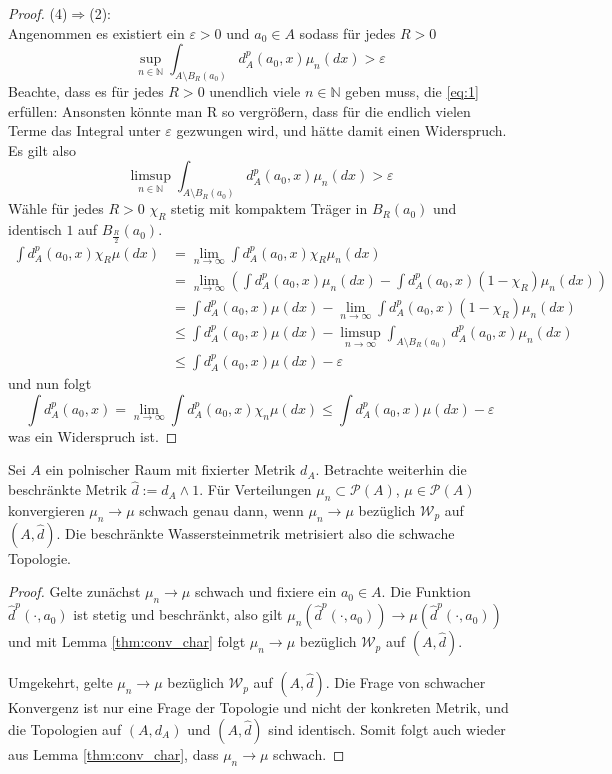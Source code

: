 \begin{proof}
(4)$\Rightarrow$(2): \\
Angenommen es existiert ein $\varepsilon > 0$ und $a_0 \in A$ sodass für jedes $R>0$ 
\begin{equation} \label{eq:1}
\sup\limits_{n\in\mathbb{N}}\int_{A\setminus B_R(a_0)}d_A^p(a_0, x)\mu_n(dx)>\varepsilon
\end{equation}
Beachte, dass es für jedes $R>0$ unendlich viele $n \in \mathbb{N}$ geben muss, die \ref{eq:1} erfüllen: Ansonsten könnte man R so vergrößern, dass für die endlich vielen Terme das Integral unter $\varepsilon$ gezwungen wird, und hätte damit einen Widerspruch. Es gilt also
$$\limsup\limits_{n\in\mathbb{N}}\int_{A\setminus B_R(a_0)}d^p_A(a_0, x)\mu_n(dx)>\varepsilon$$
Wähle für jedes $R>0$ $\chi_R$ stetig mit kompaktem Träger in $B_R(a_0)$ und identisch $1$ auf $B_{\frac{R}{2}}(a_0)$.
\begin{align*}
    \int d^p_A(a_0, x)\chi_R\mu(dx) &= \lim\limits_{n\rightarrow\infty}\int d^p_A(a_0, x)\chi_R \mu_n(dx) \\
    &= \lim\limits_{n\rightarrow\infty}\left(\int d^p_A(a_0, x)\mu_n(dx) - \int d^p_A(a_0, x)(1-\chi_R)\mu_n(dx) \right) \\
    &= \int d^p_A(a_0, x)\mu(dx) - \lim\limits_{n\rightarrow\infty}\int d^p_A(a_0, x)(1-\chi_R)\mu_n(dx) \\
    &\leq \int d^p_A(a_0, x)\mu(dx) - \limsup\limits_{n\rightarrow\infty} \int_{A\setminus B_R(a_0)}d^p_A(a_0, x)\mu_n(dx) \\
    &\leq \int d^p_A(a_0, x)\mu(dx) - \varepsilon
\end{align*}
und nun folgt
$$\int d^p_A(a_0, x) = \lim\limits_{n\rightarrow\infty} \int d^p_A(a_0, x)\chi_n\mu(dx) \leq \int d^p_A(a_0, x)\mu(dx) - \varepsilon$$
was ein Widerspruch ist.
\end{proof}
\begin{lemma} \label{thm:weak_topology_metric}
Sei $A$ ein polnischer Raum mit fixierter Metrik $d_A$. Betrachte weiterhin die beschränkte Metrik $\widehat{d}:=d_A \wedge 1$. Für Verteilungen $\mu_n \subset \mathcal{P}(A)$, $\mu \in \mathcal{P}(A)$ konvergieren $\mu_n \rightarrow \mu$ schwach genau dann, wenn $\mu_n \rightarrow \mu$ bezüglich $\mathcal{W}_p$ auf $(A, \widehat{d})$. Die beschränkte Wassersteinmetrik metrisiert also die schwache Topologie.
\end{lemma}
\begin{proof}
    Gelte zunächst $\mu_n \rightarrow \mu$ schwach und fixiere ein $a_0 \in A$. Die Funktion $\widehat{d}^p(\cdot, a_0)$ ist stetig und beschränkt, also gilt $\mu_n(\widehat{d}^p(\cdot, a_0)) \rightarrow \mu(\widehat{d}^p(\cdot, a_0))$ und mit Lemma \ref{thm:conv_char} folgt $\mu_n \rightarrow \mu$ bezüglich $\mathcal{W}_p$ auf $(A, \widehat{d})$.

    Umgekehrt, gelte $\mu_n \rightarrow \mu$ bezüglich $\mathcal{W}_p$ auf $(A, \widehat{d})$. Die Frage von schwacher Konvergenz ist nur eine Frage der Topologie und nicht der konkreten Metrik, und die Topologien auf $(A, d_A)$ und $(A, \widehat{d})$ sind identisch. Somit folgt auch wieder aus Lemma \ref{thm:conv_char}, dass $\mu_n \rightarrow \mu$ schwach.
\end{proof}
